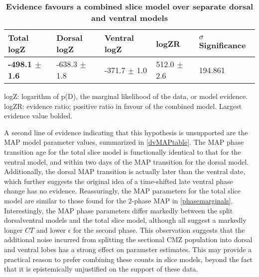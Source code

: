 \begin{table}[!ht]
    \centering
    \caption{{\bf Evidence favours a combined slice model over separate dorsal and ventral models}}
    \begin{tabular}{|l|l|l|l|l|}
        \hline
        {\bf Total logZ} & {\bf Dorsal logZ} & {\bf Ventral logZ} & {\bf logZR} & {\bf $\sigma$ Significance}\\ \hline
        {\bf -498.1 $\pm$ 1.6} & -638.3 $\pm$ 1.8 & -371.7 $\pm$ 1.0 & 512.0 $\pm$ 2.6 & 194.861\\ \hline
        \end{tabular}
    \begin{flushleft} logZ: logarithm of p(D), the marginal likelihood of the data, or model evidence. logZR: evidence ratio; positive ratio in favour of the combined model. Largest evidence value bolded.
    \end{flushleft}
    \label{dvtable}
\end{table}

A second line of evidence indicating that this hypothesis is unsupported are the MAP model parameter values, summarized in \autoref{dvMAPtable}. The MAP phase transition age for the total slice model is functionally identical to that for the ventral model, and within two days of the MAP transition for the dorsal model. Additionally, the dorsal MAP transition is actually later than the ventral date, which further suggests the original idea of a time-shifted late ventral phase change has no evidence. Reassuringly, the MAP parameters for the total slice model are similar to those found for the 2-phase MAP in \autoref{phasemarginals}. Interestingly, the MAP phase parameters differ markedly between the split dorsal\/ventral models and the total slice model, although all suggest a markedly longer $CT$ and lower $\epsilon$ for the second phase. This observation suggests that the additional noise incurred from splitting the sectional CMZ population into dorsal and ventral lobes has a strong effect on parameter estimates. This may provide a practical reason to prefer combining these counts in slice models, beyond the fact that it is epistemically unjustified on the support of these data. 

